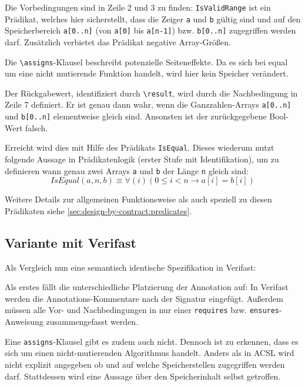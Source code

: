 Die Vorbedingungen sind in Zeile 2 und 3 zu finden: \lstinline{IsValidRange} ist ein Prädikat, welches hier sicherstellt,
dass die Zeiger \lstinline{a} und \lstinline{b} gültig sind und auf den Speicherbereich \lstinline{a[0..n]} 
(von \lstinline{a[0]} bis \lstinline{a[n-1]}) bzw. \lstinline{b[0..n]} zugegriffen 
werden darf. Zusätzlich verbietet das Prädikat negative Array-Größen.

Die \lstinline{\assigns}-Klausel beschreibt potenzielle Seiteneffekte. Da es sich bei equal um eine nicht mutierende
Funktion handelt, wird hier kein Speicher verändert.

Der Rückgabewert, identifiziert durch \lstinline{\result}, wird durch die Nachbedingung in Zeile 7 definiert. Er ist genau dann
wahr, wenn die Ganzzahlen-Arrays \lstinline{a[0..n]} und \lstinline{b[0..n]} elementweise gleich sind. Ansonsten ist der 
zurückgegebene Bool-Wert falsch. 

Erreicht wird dies mit Hilfe des Prädikats \lstinline{IsEqual}. Dieses wiederum
nutzt folgende Aussage in Prädikatenlogik (erster Stufe mit Identifikation), um zu definieren wann genau 
zwei Arrays \lstinline{a} und \lstinline{b} der Länge \lstinline{n} gleich sind:
\[IsEqual(a, n, b) \equiv \forall(i) (0 \leq i < n \rightarrow a[i] = b[i])\]

Weitere Details zur allgemeinen Funktionsweise als auch speziell zu diesen Prädikaten siehe
\ref{sec:design-by-contract:predicates}.



\subsection{Variante mit Verifast}
\label{sec:design-by-contract:verifast-variante}

Als Vergleich nun eine semantisch identische Spezifikation in Verifast:



Als erstes fällt die unterschiedliche Platzierung der Annotation auf: In Verifast werden die 
Annotations-Kommentare nach der Signatur eingefügt. Außerdem müssen alle Vor- und Nachbedingungen
in nur einer \lstinline{requires} bzw. \lstinline{ensures}-Anweisung zusammengefasst werden.

Eine \lstinline{assigns}-Klausel gibt es zudem auch nicht. Dennoch ist zu erkennen, dass es sich um einen 
nicht-mutierenden Algorithmus handelt. Anders als in ACSL wird nicht explizit angegeben ob und auf welche 
Speicherstellen zugegriffen werden darf. Stattdessen wird eine Aussage über den Speicherinhalt selbst getroffen.

